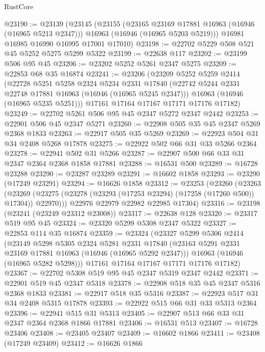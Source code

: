 \begin{lexlean}{RustCore}
\begin{coremodule}
@23190 := @23139
    (@23145
      (@23155
        (@23165 @23169 @17881 @16963 (@16946 (@16965 @5213 @2347)))
        @16963
        (@16946 (@16965 @5203 @5219)))
      @16981
      @16985
      @16990
      @16995
      @17001
      @17010)
@23198 := @22702 @5229 @508 @521 @45 @5252 @5275 @5299 @5322
@23199 := @22638 @117
@23202 := @23199 @506 @95 @45
@23206 := @23202 @5252 @5261 @2347 @5275
@23209 := @22853 @68 @35 @16874
@23241 := @23206
    (@23209
      @5252
      @5259
      @2414
      (@22728
        @5251
        @5258
        @2324
        @5234
        @2331
        @17840
        (@22742 @5244 @2331 @22748 @17881 @16963 (@16946 (@16965 @5245 @2347)))
        @16963
        (@16946 (@16965 @5235 @5251)))
      @17161
      @17164
      @17167
      @17171
      @17176
      @17182)
@23249 := @22702 @5261 @506 @95 @45 @2347 @5272 @2347 @2442
@23253 := @22901 @506 @45 @2347 @5271
@23260 := @22908 @505 @35 @45 @2347 @5269 @2368 @1833
@23263 := @22917 @505 @35 @5269
@23269 := @22923 @504 @31 @34 @2408 @5268 @17878
@23275 := @22922 @502 @66 @31 @33 @5266 @2364
@23278 := @22941 @502 @31 @5266
@23287 := @22907 @500 @66 @33 @31 @2347 @2364 @2368 @1858 @17881
@23288 := @16531 @500
@23289 := @16728 @23288
@23290 := @23287 @23289
@23291 := @16602 @1858
@23293 := @23290 (@17249 @23291)
@23294 := @16626 @1858
@23312 := @23253
    (@23260
      (@23263
        (@23269 (@23275 (@23278 (@23293 (@17253 @23294) (@17258 (@17260 @500)) @17304)) @22970)))
      @22976
      @22979
      @22982
      @22985
      @17304)
@23316 := @23198 (@23241 (@23249 @23312 @23008))
@23317 := @22638 @128
@23320 := @23317 @519 @95 @45
@23324 := @23320 @5299 @5308 @2347 @5322
@23327 := @22853 @114 @35 @16874
@23359 := @23324
    (@23327
      @5299
      @5306
      @2414
      (@23149
        @5298
        @5305
        @2324
        @5281
        @2331
        @17840
        (@23163 @5291 @2331 @23169 @17881 @16963 (@16946 (@16965 @5292 @2347)))
        @16963
        (@16946 (@16965 @5282 @5298)))
      @17161
      @17164
      @17167
      @17171
      @17176
      @17182)
@23367 := @22702 @5308 @519 @95 @45 @2347 @5319 @2347 @2442
@23371 := @22901 @519 @45 @2347 @5318
@23378 := @22908 @518 @35 @45 @2347 @5316 @2368 @1833
@23381 := @22917 @518 @35 @5316
@23387 := @22923 @517 @31 @34 @2408 @5315 @17878
@23393 := @22922 @515 @66 @31 @33 @5313 @2364
@23396 := @22941 @515 @31 @5313
@23405 := @22907 @513 @66 @33 @31 @2347 @2364 @2368 @1866 @17881
@23406 := @16531 @513
@23407 := @16728 @23406
@23408 := @23405 @23407
@23409 := @16602 @1866
@23411 := @23408 (@17249 @23409)
@23412 := @16626 @1866

\end{coremodule}
\end{lexlean}
